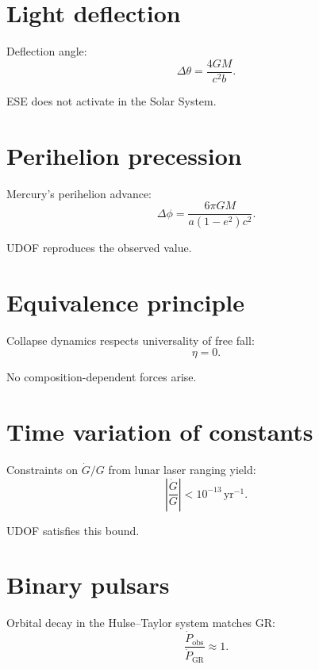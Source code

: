 \documentclass[11pt]{book}
\begin{document}
\section{Light deflection}

Deflection angle:
\begin{equation}
\Delta \theta =
\frac{4GM}{c^2 b}.
\end{equation}

ESE does not activate in the Solar System.

\section{Perihelion precession}

Mercury's perihelion advance:
\begin{equation}
\Delta \phi =
\frac{6\pi GM}{a(1 - e^2)c^2}.
\end{equation}

UDOF reproduces the observed value.

\section{Equivalence principle}

Collapse dynamics respects universality of free fall:
\begin{equation}
\eta = 0.
\end{equation}

No composition-dependent forces arise.

\section{Time variation of constants}

Constraints on $\dot{G}/G$ from lunar laser ranging yield:
\begin{equation}
\left|\frac{\dot{G}}{G}\right| < 10^{-13}\,\mathrm{yr}^{-1}.
\end{equation}

UDOF satisfies this bound.

\section{Binary pulsars}

Orbital decay in the Hulse--Taylor system matches GR:
\begin{equation}
\frac{\dot{P}_{\mathrm{obs}}}{\dot{P}_{\mathrm{GR}}} \approx 1.
\end{equation}
\end{document}
